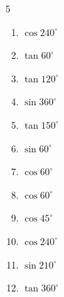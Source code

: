 \begin{multicols}{5}
\begin{enumerate}

  \item $\displaystyle \cos{240^\circ}$


  \item $\displaystyle \tan{60^\circ}$


  \item $\displaystyle \tan{120^\circ}$


  \item $\displaystyle \sin{360^\circ}$

        \phantom{$\displaystyle =0$}

  \item $\displaystyle \tan{150^\circ}$


  \item $\displaystyle \sin{60^\circ}$


\columnbreak %

  \item $\displaystyle \cos{60^\circ}$


  \item $\displaystyle \cos{60^\circ}$


  \item $\displaystyle \cos{45^\circ}$


  \item $\displaystyle \cos{240^\circ}$


  \item $\displaystyle \sin{210^\circ}$


  \item $\displaystyle \tan{360^\circ}$

        \phantom{$\displaystyle =0$}


\end{enumerate}
\end{multicols}
